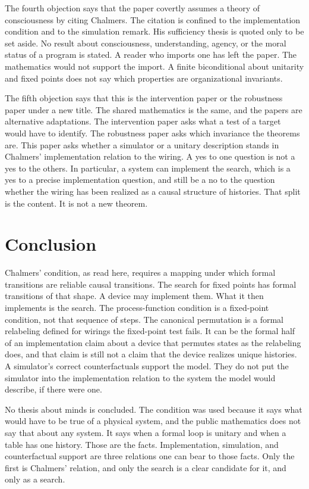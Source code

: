 \documentclass[11pt]{article}
\begin{document}
The fourth objection says that the paper covertly assumes a theory of consciousness by citing Chalmers. The citation is confined to the implementation condition and to the simulation remark. His sufficiency thesis is quoted only to be set aside. No result about consciousness, understanding, agency, or the moral status of a program is stated. A reader who imports one has left the paper. The mathematics would not support the import. A finite biconditional about unitarity and fixed points does not say which properties are organizational invariants.

The fifth objection says that this is the intervention paper or the robustness paper under a new title. The shared mathematics is the same, and the papers are alternative adaptations. The intervention paper asks what a test of a target would have to identify. The robustness paper asks which invariance the theorems are. This paper asks whether a simulator or a unitary description stands in Chalmers' implementation relation to the wiring. A yes to one question is not a yes to the others. In particular, a system can implement the search, which is a yes to a precise implementation question, and still be a no to the question whether the wiring has been realized as a causal structure of histories. That split is the content. It is not a new theorem.

\section{Conclusion}
\label{sec:end}

Chalmers' condition, as read here, requires a mapping under which formal transitions are reliable causal transitions. The search for fixed points has formal transitions of that shape. A device may implement them. What it then implements is the search. The process-function condition is a fixed-point condition, not that sequence of steps. The canonical permutation is a formal relabeling defined for wirings the fixed-point test fails. It can be the formal half of an implementation claim about a device that permutes states as the relabeling does, and that claim is still not a claim that the device realizes unique histories. A simulator's correct counterfactuals support the model. They do not put the simulator into the implementation relation to the system the model would describe, if there were one.

No thesis about minds is concluded. The condition was used because it says what would have to be true of a physical system, and the public mathematics does not say that about any system. It says when a formal loop is unitary and when a table has one history. Those are the facts. Implementation, simulation, and counterfactual support are three relations one can bear to those facts. Only the first is Chalmers' relation, and only the search is a clear candidate for it, and only as a search.
\end{document}
